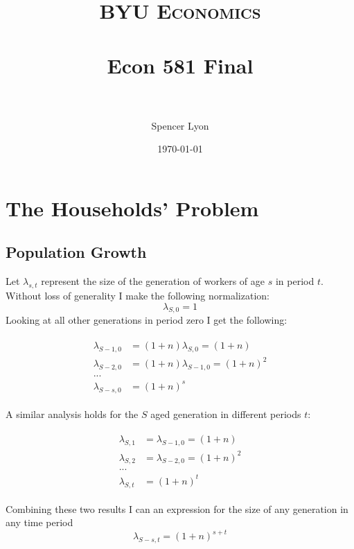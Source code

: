 \documentclass[paper=a4, fontsize=11pt]{scrartcl} %
\title{
	\normalfont \normalsize
	\textsc{BYU Economics} \\ [25pt] %
	\horrule{0.5pt} \\[0.4cm] %
	\huge Econ 581 Final \\ %
	\horrule{2pt} \\[0.5cm] %
	}
\author{Spencer Lyon} %
\date{\normalsize\today} %
\numberwithin{figure}{section} %
\numberwithin{table}{section} %
\begin{document}
\maketitle %
\thispagestyle{empty}
\pagestyle{fancyplain}


\section{The Households' Problem}

	\subsection{Population Growth}

		Let $\lambda_{s, t}$ represent the size of the generation of workers of age $s$ in period $t$. Without loss of generality I make the following normalization: $$\lambda_{S, 0} = 1$$ Looking at all other generations in period zero I get the following:

		\begin{align} \label{eq:lamGen}
		\begin{split}
			\lambda_{S-1, 0} &= (1 + n) \lambda_{S, 0} = (1 + n) \\
					\lambda_{S-2, 0} &= (1 + n) \lambda_{S - 1, 0} = (1 + n) ^ 2 \\
					... \\
					\lambda_{S-s, 0} &= (1 + n)^s
		\end{split}
		\end{align}

		A similar analysis holds for the $S$ aged generation in different periods $t$:

		\begin{align} \label{eq:lamTime}
		\begin{split}
			\lambda_{S, 1} &= \lambda_{S-1, 0} = (1 + n) \\
					\lambda_{S, 2} &= \lambda_{S - 2, 0} = (1 + n) ^ 2 \\
					... \\
					\lambda_{S, t} &= (1 + n)^t
		\end{split}
		\end{align}

		Combining these two results I can an expression for the size of any generation in any time period $$\lambda_{S-s, t} = (1 + n) ^{s + t}$$
\end{document}

